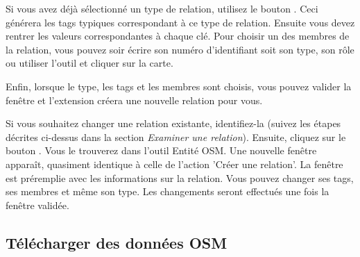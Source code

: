 Si vous avez déjà sélectionné un type de relation, utilisez le bouton . Ceci générera les tags typiques correspondant à ce type de relation. Ensuite vous devez rentrer les valeurs correspondantes à chaque clé. Pour choisir un des membres de la relation, vous pouvez soir écrire son numéro d'identifiant soit son type, son rôle ou utiliser l'outil  et cliquer sur la carte.

Enfin, lorsque le type, les tags et les membres sont choisis, vous pouvez valider la fenêtre et l'extension créera une nouvelle relation pour vous.


Si vous souhaitez changer une relation existante, identifiez-la (suivez les étapes décrites ci-dessus dans la section \textit{Examiner une relation}). Ensuite, cliquez sur le bouton . Vous le trouverez dans l'outil Entité OSM. Une nouvelle fenêtre apparaît, quasiment identique à celle de l'action 'Créer une relation'. La fenêtre est préremplie avec les informations sur la relation. Vous pouvez changer ses tags, ses membres et même son type. Les changements seront effectués une fois la fenêtre validée.

\subsection{Télécharger des données OSM}  

